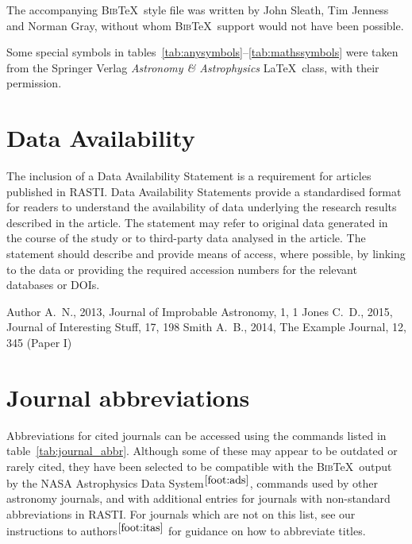 \documentclass[fleqn,usenatbib,useAMS]{rasti}
\newcommand{\bibtex}{\textsc{Bib}\!\TeX} %
\begin{document}
The accompanying \bibtex\ style file was written by John Sleath, Tim Jenness and Norman Gray, without whom \bibtex\ support would not have been possible.

Some special symbols in tables~\ref{tab:anysymbols}--\ref{tab:mathssymbols} were taken from the Springer Verlag \textit{Astronomy \& Astrophysics} \LaTeX\ class, with their permission.


\section*{Data Availability}

 
The inclusion of a Data Availability Statement is a requirement for articles published in RASTI. Data Availability Statements provide a standardised format for readers to understand the availability of data underlying the research results described in the article. The statement may refer to original data generated in the course of the study or to third-party data analysed in the article. The statement should describe and provide means of access, where possible, by linking to the data or providing the required accession numbers for the relevant databases or DOIs.




%


\begin{thebibliography}{99}
Author A.~N., 2013, Journal of Improbable Astronomy, 1, 1
Jones C.~D., 2015, Journal of Interesting Stuff, 17, 198
Smith A.~B., 2014, The Example Journal, 12, 345 (Paper I)
\end{thebibliography}




\appendix
\section{Journal abbreviations}
\label{sec:abbreviations}
Abbreviations for cited journals can be accessed using the commands listed in table~\ref{tab:journal_abbr}.
Although some of these may appear to be outdated or rarely cited, they have been selected to be compatible with the \bibtex\ output by the NASA Astrophysics Data System$^{\ref{foot:ads}}$, commands used by other astronomy journals, and with additional entries for journals with non-standard abbreviations in RASTI.
For journals which are not on this list, see our instructions to authors$^{\ref{foot:itas}}$ for guidance on how to abbreviate titles.
\end{document}
